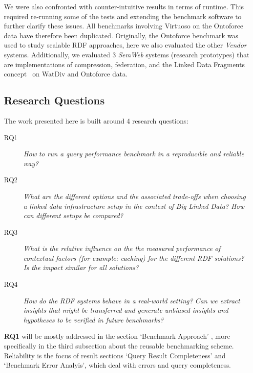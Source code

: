 We were also confronted with counter-intuitive results in terms of runtime. This required re-running some of the tests and extending the benchmark software to further clarify these issues. All benchmarks involving Virtuoso on the Ontoforce data have therefore been duplicated.
Originally, the Ontoforce benchmark was used to study scalable RDF approaches, here we also evaluated the other \emph{Vendor} systems. Additionally, we evaluated 3 \emph{SemWeb} systems (research prototypes) that are implementations of compression, federation, and the Linked Data Fragments concept~\cite{DBLP:conf/semweb/VerborghHMHVSCCMW14} on WatDiv and Ontoforce data.

\subsection{Research Questions}

The work presented here is built around 4 research questions:

\begin{description}
\item[RQ1] \emph{How to run a query performance benchmark in a reproducible and reliable way?}
\item[RQ2] \emph{What are the different options and the associated trade-offs when choosing a linked data infrastructure setup in the context of Big Linked Data? How can different setups be compared?}
\item[RQ3] \emph{What is the relative influence on the the measured performance of contextual factors (for example: caching) for the different RDF solutions? Is the impact similar for all solutions?}
\item[RQ4] \emph{How do the RDF systems behave in a real-world setting? Can we extract insights that might be transferred and generate unbiased insights and hypotheses to be verified in future benchmarks?}
\end{description} 

\textbf{RQ1} will be mostly addressed in the section `Benchmark Approach' , more specifically in the third subsection about the reusable benchmarking scheme. Reliability is the focus of result sections `Query Result Completeness' and `Benchmark Error Analyis', 
which deal with errors and query completeness. 


